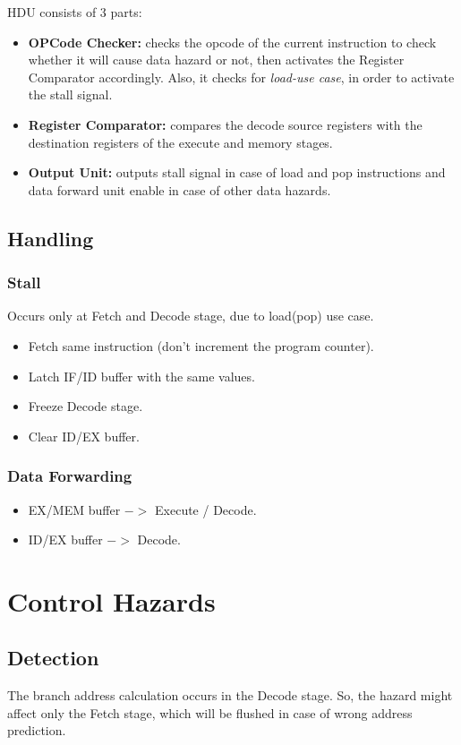 \documentclass[12pt]{report}
\begin{document}
HDU consists of 3 parts:
\begin{itemize}
    \item \textbf{OPCode Checker:} checks the opcode of the current instruction to check whether it will cause data hazard or not, then activates the Register Comparator accordingly. Also, it checks for \emph{load-use case}, in order to activate the stall signal.
    \item \textbf{Register Comparator:} compares the decode source registers with the destination registers of the execute and memory stages.
    \item \textbf{Output Unit:} outputs stall signal in case of load and pop instructions and data forward unit enable in case of other data hazards.
\end{itemize}

\subsection{Handling}

\subsubsection{Stall}
Occurs only at Fetch and Decode stage, due to load(pop) use case.
\begin{itemize}
    \item Fetch same instruction (don't increment the program counter).
    \item Latch IF/ID buffer with the same values.
    \item Freeze Decode stage.
    \item Clear ID/EX buffer.
\end{itemize}

\subsubsection{Data Forwarding}
\begin{itemize}
    \item EX/MEM buffer $->$ Execute / Decode.
    \item ID/EX buffer $->$ Decode.
\end{itemize}

\section{Control Hazards}

\subsection{Detection}
The branch address calculation occurs in the Decode stage. So, the hazard might affect only the Fetch stage, which will be flushed in case of wrong address prediction.
\end{document}
